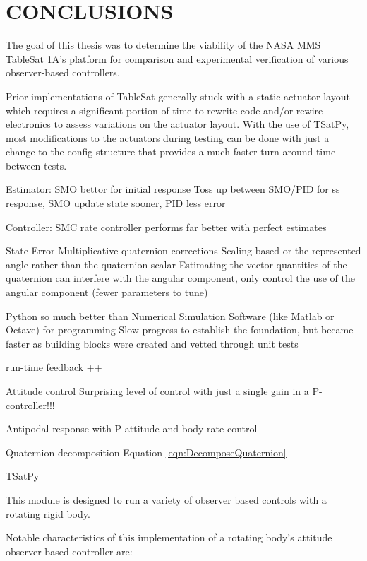 \chapter{CONCLUSIONS}
\label{chap:Conclusions}

The goal of this thesis was to determine the viability of the NASA MMS TableSat 1A's platform for comparison and experimental verification of various observer-based controllers.


Prior implementations of TableSat generally stuck with a static actuator layout which requires a significant portion of time to rewrite code and/or rewire electronics to assess variations on the actuator layout.  With the use of TSatPy, most modifications to the actuators during testing can be done with just a change to the config structure that provides a much faster turn around time between tests.




Estimator:
  SMO bettor for initial response
  Toss up between SMO/PID for ss response, SMO update state sooner, PID less error

Controller:
  SMC rate controller performs far better with perfect estimates

State Error
  Multiplicative quaternion corrections
  Scaling based or the represented angle rather than the quaternion scalar
  Estimating the vector quantities of the quaternion can interfere with the angular component, only control the use of the angular component (fewer parameters to tune)

Python so much better than Numerical Simulation Software (like Matlab or Octave) for programming
Slow progress to establish the foundation, but became faster as building blocks were created and vetted through unit tests

run-time feedback ++

Attitude control
  Surprising level of control with just a single gain in a P-controller!!!


Antipodal response with P-attitude and body rate control

Quaternion decomposition Equation \ref{eqn:DecomposeQuaternion}



TSatPy

This module is designed to run a variety of observer based controls with a rotating rigid body.

Notable characteristics of this implementation of a rotating body's attitude observer based controller are:

